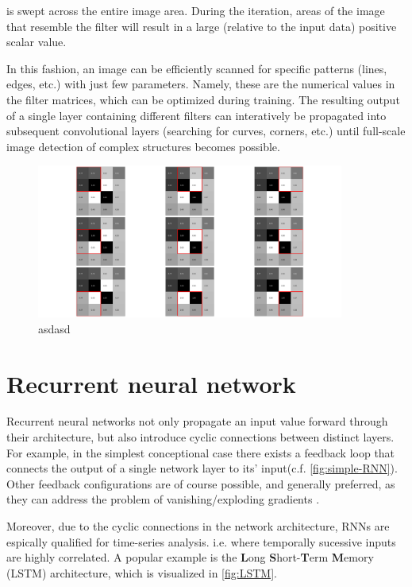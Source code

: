 is swept across the entire image area. During the iteration, areas of the image that resemble the filter will result in a large (relative to the input data)
positive scalar value.

In this fashion, an image can be efficiently scanned for specific patterns (lines, edges, etc.) with just few parameters. Namely, these are the numerical
values in the filter matrices, which can be optimized during training. The resulting output of a single layer containing different filters can interatively 
be propagated into subsequent convolutional layers (searching for curves, corners, etc.) until full-scale image detection of complex structures becomes possible.

\begin{figure}
	\centering
	\includegraphics[width=0.9\textwidth]{imgs/convolution.png}
	\caption{asdasd \label{fig:convolution}}
\end{figure}

\section{Recurrent neural network}
\label{sec:RNN}

Recurrent neural networks not only propagate an input value forward through their architecture, but also introduce cyclic connections between distinct layers. For
example, in the simplest conceptional case there exists a feedback loop that connects the output of a single network layer to its' input(c.f. 
\autoref{fig:simple-RNN}). Other feedback configurations are of course possible, and generally preferred, as they can address the problem of vanishing/exploding 
gradients \cite{hochreiter1991untersuchungen}. 

Moreover, due to the cyclic connections in the network architecture, RNNs are espically qualified for time-series analysis. i.e. where temporally sucessive inputs
are highly correlated. A popular example is the \textbf{L}ong \textbf{S}hort-\textbf{T}erm \textbf{M}emory (LSTM) architecture, which is visualized in 
\autoref{fig:LSTM}.

